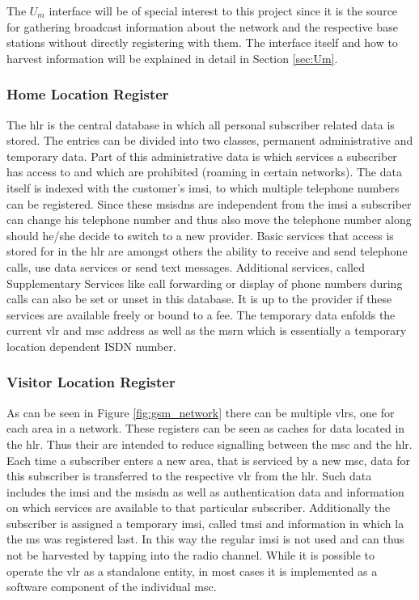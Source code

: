 The $U_m$ interface will be of special interest to this project since it is the source for gathering broadcast information about the network and the respective base stations without directly registering with them.
The interface itself and how to harvest information will be explained in detail in Section \ref{sec:Um}.

\subsubsection{Home Location Register}
The \gls{hlr} is the central database in which all personal subscriber related data is stored.
The entries can be divided into two classes, permanent administrative and temporary data.
Part of this administrative data is which services a subscriber has access to and which are prohibited (\eg roaming in certain networks).
The data itself is indexed with the customer's \gls{imsi}, to which multiple telephone numbers can be registered.
Since these \glspl{msisdn} are independent from the \gls{imsi} a subscriber can change his telephone number and thus also move the telephone number along should he/she decide to switch to a new provider.
Basic services that access is stored for in the \gls{hlr} are amongst others the ability to receive and send telephone calls, use data services or send text messages.
Additional services, called Supplementary Services like call forwarding or display of phone numbers during calls can also be set or unset in this database.
It is up to the provider if these services are available freely or bound to a fee.
The temporary data enfolds the current \gls{vlr} and \gls{msc} address as well as the \gls{msrn} which is essentially a temporary location dependent ISDN number.

\subsubsection{Visitor Location Register}
As can be seen in Figure \ref{fig:gsm_network} there can be multiple \glspl{vlr}, one for each area in a network.
These registers can be seen as caches for data located in the \gls{hlr}.
Thus their are intended to reduce signalling between the \gls{msc} and the \gls{hlr}.
Each time a subscriber enters a new area, that is serviced by a new \gls{msc}, data for this subscriber is transferred to the respective \gls{vlr} from the \gls{hlr}.
Such data includes the \gls{imsi} and the \gls{msisdn} as well as authentication data and information on which services are available to that particular subscriber.
Additionally the subscriber is assigned a temporary \gls{imsi}, called \gls{tmsi} and information in which \gls{la} the \gls{ms} was registered last.
In this way the regular \gls{imsi} is not used and can thus not be harvested by tapping into the radio channel.
While it is possible to operate the \gls{vlr} as a standalone entity, in most cases it is implemented as a software component of the individual \gls{msc}.

